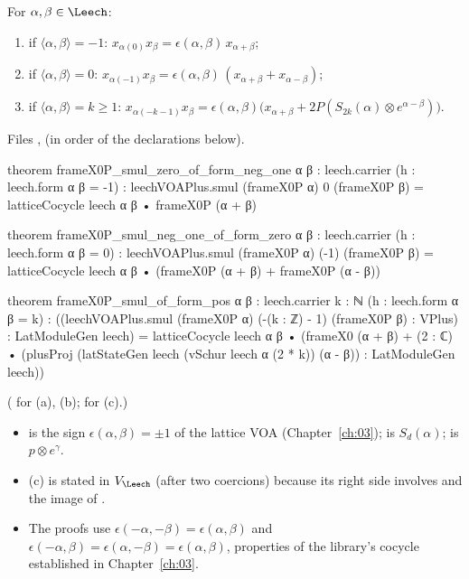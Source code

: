 \begin{theorem}\label{ch12:thm:groundprod}
For $\alpha,\beta\in\Leech$:
\begin{enumerate}[label=(\alph*)]
\item if $\langle\alpha,\beta\rangle=-1$: $x_{\alpha(0)}x_\beta=\epsilon(\alpha,\beta)\,x_{\alpha+\beta}$;
\item if $\langle\alpha,\beta\rangle=0$: $x_{\alpha(-1)}x_\beta=\epsilon(\alpha,\beta)\,(x_{\alpha+\beta}+x_{\alpha-\beta})$;
\item if $\langle\alpha,\beta\rangle=k\ge1$: $x_{\alpha(-k-1)}x_\beta=\epsilon(\alpha,\beta)\big(x_{\alpha+\beta}+2P(S_{2k}(\alpha)\otimes e^{\alpha-\beta})\big)$.
\end{enumerate}
\end{theorem}
Files ,  (in order of the declarations below).
\begin{leancode}
theorem frameX0P_smul_zero_of_form_neg_one {α β : leech.carrier} (h : leech.form α β = -1) :
    leechVOAPlus.smul (frameX0P α) 0 (frameX0P β) = latticeCocycle leech α β • frameX0P (α + β)

theorem frameX0P_smul_neg_one_of_form_zero {α β : leech.carrier} (h : leech.form α β = 0) :
    leechVOAPlus.smul (frameX0P α) (-1) (frameX0P β)
      = latticeCocycle leech α β • (frameX0P (α + β) + frameX0P (α - β))

theorem frameX0P_smul_of_form_pos {α β : leech.carrier} {k : ℕ} (h : leech.form α β = k) :
    ((leechVOAPlus.smul (frameX0P α) (-(k : ℤ) - 1) (frameX0P β) : VPlus) : LatModuleGen leech)
      = latticeCocycle leech α β • (frameX0 (α + β)
        + (2 : ℂ) • (plusProj (latStateGen leech (vSchur leech α (2 * k)) (α - β)) :
            LatModuleGen leech))
\end{leancode}
( for (a), (b); 
for (c).)
\begin{dictionary}
\begin{itemize}
\item {} is the sign $\epsilon(\alpha,\beta)=\pm1$ of the lattice VOA
  (Chapter~\ref{ch:03});  is $S_d(\alpha)$;  is
  $p\otimes e^\gamma$.
\item (c) is stated in $V_\Leech$ (after two coercions) because its right side involves
   and the image of .
\item The proofs use $\epsilon(-\alpha,-\beta)=\epsilon(\alpha,\beta)$ and
  $\epsilon(-\alpha,\beta)=\epsilon(\alpha,-\beta)=\epsilon(\alpha,\beta)$, properties of the library's
  cocycle established in Chapter~\ref{ch:03}.
\end{itemize}
\end{dictionary}

